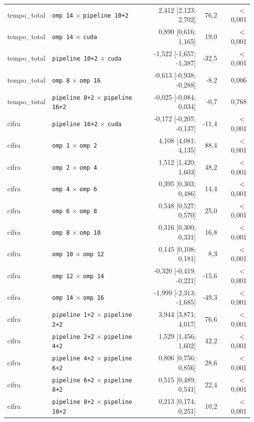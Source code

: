 \begin{tabular}{llrrr}
tempo\_total & \texttt{omp 14} $\times$ \texttt{pipeline 10+2} & 2,412 [2,123; 2,702] & 76,2 & $<$0,001 \\
tempo\_total & \texttt{omp 14} $\times$ \texttt{cuda} & 0,890 [0,616; 1,165] & 19,0 & $<$0,001 \\
tempo\_total & \texttt{pipeline 10+2} $\times$ \texttt{cuda} & -1,522 [-1,657; -1,387] & -32,5 & $<$0,001 \\
tempo\_total & \texttt{omp 8} $\times$ \texttt{omp 16} & -0,613 [-0,938; -0,288] & -8,2 & 0,006 \\
tempo\_total & \texttt{pipeline 8+2} $\times$ \texttt{pipeline 16+2} & -0,025 [-0,084; 0,034] & -0,7 & 0,768 \\
cifra & \texttt{pipeline 16+2} $\times$ \texttt{cuda} & -0,172 [-0,207; -0,137] & -11,4 & $<$0,001 \\
cifra & \texttt{omp 1} $\times$ \texttt{omp 2} & 4,108 [4,081; 4,135] & 88,4 & $<$0,001 \\
cifra & \texttt{omp 2} $\times$ \texttt{omp 4} & 1,512 [1,420; 1,603] & 48,2 & $<$0,001 \\
cifra & \texttt{omp 4} $\times$ \texttt{omp 6} & 0,395 [0,303; 0,486] & 14,4 & $<$0,001 \\
cifra & \texttt{omp 6} $\times$ \texttt{omp 8} & 0,548 [0,527; 0,570] & 25,0 & $<$0,001 \\
cifra & \texttt{omp 8} $\times$ \texttt{omp 10} & 0,316 [0,300; 0,331] & 16,8 & $<$0,001 \\
cifra & \texttt{omp 10} $\times$ \texttt{omp 12} & 0,145 [0,108; 0,181] & 8,3 & $<$0,001 \\
cifra & \texttt{omp 12} $\times$ \texttt{omp 14} & -0,320 [-0,419; -0,221] & -15,6 & $<$0,001 \\
cifra & \texttt{omp 14} $\times$ \texttt{omp 16} & -1,999 [-2,313; -1,685] & -49,3 & $<$0,001 \\
cifra & \texttt{pipeline 1+2} $\times$ \texttt{pipeline 2+2} & 3,944 [3,871; 4,017] & 76,6 & $<$0,001 \\
cifra & \texttt{pipeline 2+2} $\times$ \texttt{pipeline 4+2} & 1,529 [1,456; 1,602] & 42,2 & $<$0,001 \\
cifra & \texttt{pipeline 4+2} $\times$ \texttt{pipeline 6+2} & 0,806 [0,756; 0,856] & 28,6 & $<$0,001 \\
cifra & \texttt{pipeline 6+2} $\times$ \texttt{pipeline 8+2} & 0,515 [0,489; 0,541] & 22,4 & $<$0,001 \\
cifra & \texttt{pipeline 8+2} $\times$ \texttt{pipeline 10+2} & 0,213 [0,174; 0,251] & 10,2 & $<$0,001 \\

\end{tabular}
